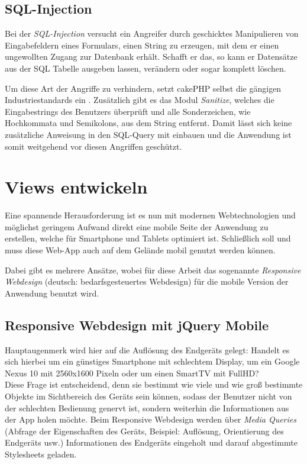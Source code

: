 \subsection{SQL-Injection}
Bei der \emph{SQL-Injection} versucht ein Angreifer durch geschicktes Manipulieren von Eingabefeldern eines Formulars, einen String zu erzeugen, mit dem er einen ungewollten Zugang zur Datenbank erhält. Schafft er das, so kann er Datensätze aus der SQL Tabelle ausgeben lassen, verändern oder sogar komplett löschen.\par

Um diese Art der Angriffe zu verhindern, setzt cakePHP selbst die gängigen Industriestandards ein \cite[S. 427f]{cakephp:injection}. Zusätzlich gibt es das Modul \emph{Sanitize}, welches die Eingabestrings des Benutzers überprüft und alle Sonderzeichen, wie Hochkommata und Semikolons, aus dem String entfernt. Damit lässt sich keine zusätzliche Anweisung in den SQL-Query mit einbauen und die Anwendung ist somit weitgehend vor diesen Angriffen geschützt.


\section{Views entwickeln}
Eine spannende Herausforderung ist es nun mit modernen Webtechnologien und möglichst geringem Aufwand direkt eine mobile Seite der Anwendung zu erstellen, welche für Smartphone und Tablets optimiert ist. Schließlich soll und muss diese Web-App auch auf dem Gelände mobil genutzt werden können.\par

Dabei gibt es mehrere Ansätze, wobei für diese Arbeit das sogenannte \emph{Responsive Webdesign} (deutsch: bedarfsgesteuertes Webdesign) für die mobile Version der Anwendung benutzt wird.

\subsection{Responsive Webdesign mit jQuery Mobile}
Hauptaugenmerk wird hier auf die Auflösung des Endgeräts gelegt: Handelt es sich hierbei um ein günstiges Smartphone mit schlechtem Display, um ein Google Nexus 10 mit 2560x1600 Pixeln oder um einen SmartTV mit FullHD?\\
Diese Frage ist entscheidend, denn sie bestimmt wie viele und wie groß bestimmte Objekte im Sichtbereich des Geräts sein können, sodass der Benutzer nicht von der schlechten Bedienung genervt ist, sondern weiterhin die Informationen aus der App holen möchte. Beim Responsive Webdesign werden über \emph{Media Queries} (Abfrage der Eigenschaften des Geräts, Beispiel: Auflösung, Orientierung des Endgeräts usw.) Informationen des Endgeräts eingeholt und darauf abgestimmte Stylesheets geladen.\par


